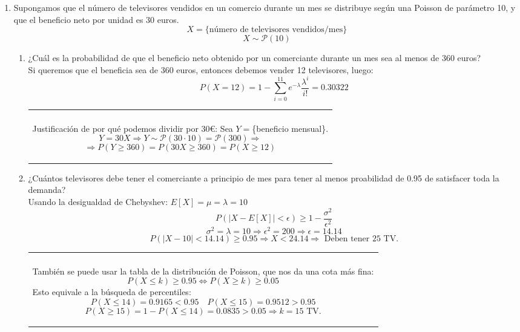 \documentclass[11pt]{article}
\newcommand{\warning}{\textbf{\color{red}{ {\fontencoding{U}\fontfamily{futs}\selectfont\char 66\relax} }}}
\newenvironment{aclaration}    
{
\begin{center}
\begin{tabular}{|p{0.9\textwidth}|}
\hline \\ \warning
}{
\\\hline
\end{tabular} 
\end{center}
}
\begin{document}
\begin{enumerate}
\item Supongamos que el número de televisores vendidos en un comercio durante un mes se distribuye según una Poisson de parámetro 10, y que el beneficio neto por unidad es 30 euros.
\[
X = \{\text{número de televisores vendidos/mes}\}
\]
\[
X \sim \mathcal{P}(10)
\]
\begin{enumerate}
\item ¿Cuál es la probabilidad de que el beneficio neto obtenido por un comerciante durante un mes sea al menos de 360 euros? \\

Si queremos que el beneficia sea de 360 euros, entonces debemos vender 12 televisores, luego:
\[
P(X=12)=1-\sum_{i=0}^{11}e^{-\lambda}\frac{\lambda^i}{i!}=0.30322
\]

\begin{aclaration}
Justificación de por qué podemos dividir por 30\euro: Sea $Y=$\{beneficio mensual\}.
\[
Y=30X \Longrightarrow Y \sim \mathcal{P}(30\cdot 10)=\mathcal{P}(300)\Longrightarrow 
\]
\[
\Longrightarrow P(Y\geq 360)=P(30X\geq 360)=P(X\geq 12)
\]
\end{aclaration}

\item ¿Cuántos televisores debe tener el comerciante a principio de mes para tener al menos proabilidad de 0.95 de satisfacer toda la demanda?\\

Usando la desigualdad de Chebyshev: $E[X]=\mu=\lambda=10$
\[
P(|X-E[X]|< \epsilon) \geq 1 - \frac{\sigma^2}{\epsilon^2}
\]
\[
\sigma^2=\lambda=10 \Longrightarrow \epsilon^2=200 \Longrightarrow \epsilon = 14.14
\]
\[P(|X-10|< 14.14) \geq 0.95 \Longrightarrow X < 24.14 \Longrightarrow \text{ Deben tener 25 TV.}\]

\begin{aclaration}
También se puede usar la tabla de la distribución de Poisson, que nos da una cota más fina:
\[
P(X\leq k) \geq 0.95 \Longleftrightarrow P(X \geq k) \geq 0.05
\]
Esto equivale a la búsqueda de percentiles:
\[
P(X\leq 14) = 0.9165 < 0.95 \quad P(X\leq 15) = 0.9512 > 0.95
\]
\[
P(X\geq 15)=1-P(X\leq 14)=0.0835 > 0.05 \Longrightarrow k=15 \text{ TV.}
\]
\end{aclaration}

\end{enumerate}

\end{enumerate}
\end{document}
